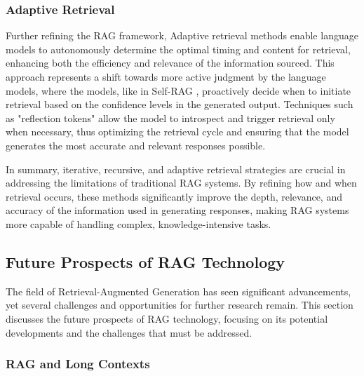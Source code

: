 \subsubsection{Adaptive Retrieval}

Further refining the RAG framework, Adaptive retrieval methods enable language models to autonomously determine the optimal timing and content for retrieval, enhancing both the efficiency and relevance of the information sourced. This approach represents a shift towards more active judgment by the language models, where the models, like in Self-RAG \cite{asai2023self}, proactively decide when to initiate retrieval based on the confidence levels in the generated output. Techniques such as "reflection tokens" allow the model to introspect and trigger retrieval only when necessary, thus optimizing the retrieval cycle and ensuring that the model generates the most accurate and relevant responses possible.

In summary, iterative, recursive, and adaptive retrieval strategies are crucial in addressing the limitations of traditional RAG systems. By refining how and when retrieval occurs, these methods significantly improve the depth, relevance, and accuracy of the information used in generating responses, making RAG systems more capable of handling complex, knowledge-intensive tasks.

\subsection{Future Prospects of RAG Technology}

The field of Retrieval-Augmented Generation has seen significant advancements, yet several challenges and opportunities for further research remain. This section discusses the future prospects of RAG technology, focusing on its potential developments and the challenges that must be addressed.

\subsubsection{RAG and Long Contexts}

